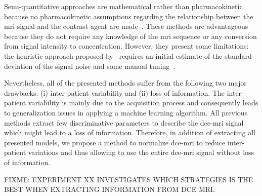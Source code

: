 \documentclass[a4paper,num-refs]{wiley-article}
\begin{document}
Semi-quantitative approaches are mathematical rather than
pharmacokinetic because no pharmacokinetic assumptions regarding the
relationship between the \ac{mri} signal and the contrast agent are
made~\cite{huisman2001accurate,gliozzi2011phenomenological}. These methods are
advantageous because they do not require any knowledge of the \ac{mri} sequence
or any conversion from signal intensity to concentration. However, they present
some limitations: the heuristic approach proposed
by~\citeauthor{huisman2001accurate} requires an initial estimate of the
standard deviation of the signal noise and some manual
tuning~\cite{huisman2001accurate}.

Nevertheless, all of the presented methods suffer from the following two major
drawbacks: (i) inter-patient variability and (ii) loss of information. The
inter-patient variability is mainly due to the acquisition process and
consequently leads to generalization issues in applying a machine learning
algorithm. All previous methods extract few discriminative parameters to
describe the \ac{dce}-\ac{mri} signal which might lead to a loss of
information. Therefore, in addition of extracting all presented models, we
propose a method to normalize \ac{dce}-\ac{mri} to reduce inter-patient
variations and thus allowing to use the entire \ac{dce}-\ac{mri} signal without
loss of information.

FIXME: EXPERIMENT XX INVESTIGATES WHICH STRATEGIES IS THE BEST WHEN EXTRACTING
INFORMATION FROM DCE MRI.
\end{document}
